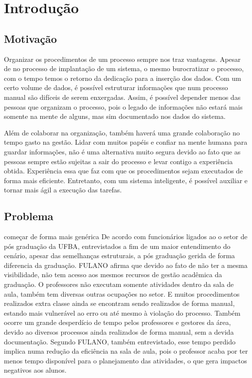 \chapter{Introdução}

\section{Motivação}

Organizar os procedimentos de um processo sempre nos traz vantagens. Apesar de no processo de implantação de um sistema, o mesmo burocratizar o processo, com o tempo temos o retorno da dedicação para a inserção dos dados. Com um certo volume de dados, é possível estruturar informações que num processo manual são difíceis de serem enxergadas. Assim, é possível depender menos das pessoas que organizam o processo, pois o legado de informações não estará mais somente na mente de alguns, mas sim documentado nos dados do sistema.

Além de colaborar na organização, também haverá uma grande colaboração no tempo gasto na gestão. Lidar com muitos papéis e confiar na mente humana para guardar informações, não é uma alternativa muito segura devido ao fato que as pessoas sempre estão sujeitas a sair do processo e levar contigo a experiência obtida. Experiência essa que faz com que os procedimentos sejam executados de forma mais eficiente. Entretanto, com um sistema inteligente, é possível auxiliar e tornar mais ágil a execução das tarefas.


\section{Problema}

começar de forma mais genérica
De acordo com funcionários ligados ao o setor de pós graduação da UFBA, entrevistados a fim de um maior entendimento do cenário, apesar das semelhanças estruturais, a pós graduação gerida de forma diferencia da graduação. FULANO afirma que devido ao fato de não ter a mesma visibilidade, não tem acesso aos mesmos recursos de gestão acadêmica da graduação. O professores não executam somente atividades dentro da sala de aula, também tem diversas outras ocupações no setor. E muitos procedimentos realizados extra classe ainda se encontram sendo realizados de forma manual, estando mais vulnerável ao erro ou até mesmo à violação do processo. Também ocorre um grande desperdício de tempo pelos professores e gestores da área, devido ao diversos processos ainda realizados de forma manual, sem a devida documentação. Segundo FULANO, também entrevistado, esse tempo perdido implica numa redução da eficiência na sala de aula, pois o professor acaba por ter menos tempo disponível para o planejamento das atividades, o que gera impactos negativos aos alunos.


